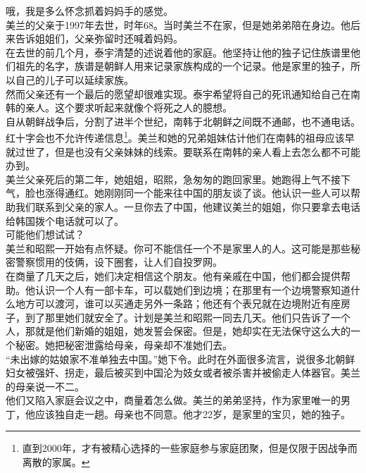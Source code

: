 哦，我是多么怀念抓着妈妈手的感觉。\\

美兰的父亲于1997年去世，时年68。当时美兰不在家，但是她弟弟陪在身边。他后来告诉姐姐们，父亲弥留时还喊着妈妈。\\

在去世的前几个月，泰宇清楚的述说着他的家庭。他坚持让他的独子记住族谱里他们祖先的名字，族谱是朝鲜人用来记录家族构成的一个记录。他是家里的独子，所以自己的儿子可以延续家族。\\

然而父亲还有一个最后的愿望却很难实现。泰宇希望将自己的死讯通知给自己在南韩的亲人。这个要求听起来就像个将死之人的臆想。\\

自从朝鲜战争后，分割了进半个世纪，南韩于北朝鲜之间既不通邮，也不通电话。红十字会也不允许传递信息\footnote{直到2000年，才有被精心选择的一些家庭参与家庭团聚，但是仅限于因战争而离散的家属。}。美兰和她的兄弟姐妹估计他们在南韩的祖母应该早就过世了，但是也没有父亲妹妹的线索。要联系在南韩的亲人看上去怎么都不可能办到。\\

美兰父亲死后的第二年，她姐姐，昭熙，急匆匆的跑回家里。她跑得上气不接下气，脸也涨得通红。她刚刚同一个能来往中国的朋友谈了谈。他认识一些人可以帮助我们联系到父亲的家人。一旦你去了中国，他建议美兰的姐姐，你只要拿去电话给韩国拨个电话就可以了。\\

可能他们想试试？\\

美兰和昭熙一开始有点怀疑。你可不能信任一个不是家里人的人。这可能是那些秘密警察惯用的伎俩，设下圈套，让人们自投罗网。\\

在商量了几天之后，她们决定相信这个朋友。他有亲戚在中国，他们都会提供帮助。他认识一个人有一部卡车，可以载她们到边境；在那里有一个边境警察知道什么地方可以渡河，谁可以买通走另外一条路；他还有个表兄就在边境附近有座房子，到了那里她们就安全了。计划是美兰和昭熙一同去几天。他们只告诉了一个人，那就是他们新婚的姐姐，她发誓会保密。但是，她却实在无法保守这么大的一个秘密。她把秘密泄露给母亲，母亲却不准她们去。\\

“未出嫁的姑娘家不准单独去中国。”她下令。此时在外面很多流言，说很多北朝鲜妇女被强奸、拐走，最后被买到中国沦为妓女或者被杀害并被偷走人体器官。美兰的母亲说一不二。\\

他们又陷入家庭会议之中，商量着怎么做。美兰的弟弟坚持，作为家里唯一的男丁，他应该独自走一趟。母亲也不同意。他才22岁，是家里的宝贝，她的独子。\\

